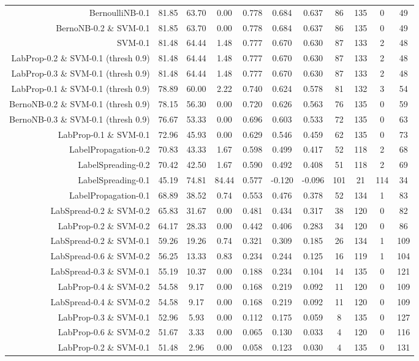 \begin{table}[!htb]
\begin{tabular}{r|c|c|c|c|c|c|c|c|c|c}
BernoulliNB-0.1 & 81.85 & 63.70 & 0.00 & 0.778 & 0.684 & 0.637 & 86 & 135 & 0 & 49 \\ 
BernoNB-0.2 \& SVM-0.1 & 81.85 & 63.70 & 0.00 & 0.778 & 0.684 & 0.637 & 86 & 135 & 0 & 49 \\ 
SVM-0.1 & 81.48 & 64.44 & 1.48 & 0.777 & 0.670 & 0.630 & 87 & 133 & 2 & 48 \\ 
LabProp-0.2 \& SVM-0.1 (thresh 0.9) & 81.48 & 64.44 & 1.48 & 0.777 & 0.670 & 0.630 & 87 & 133 & 2 & 48 \\ 
LabProp-0.3 \& SVM-0.1 (thresh 0.9) & 81.48 & 64.44 & 1.48 & 0.777 & 0.670 & 0.630 & 87 & 133 & 2 & 48 \\ 
LabProp-0.1 \& SVM-0.1 (thresh 0.9) & 78.89 & 60.00 & 2.22 & 0.740 & 0.624 & 0.578 & 81 & 132 & 3 & 54 \\ 
BernoNB-0.2 \& SVM-0.1 (thresh 0.9) & 78.15 & 56.30 & 0.00 & 0.720 & 0.626 & 0.563 & 76 & 135 & 0 & 59 \\ 
BernoNB-0.3 \& SVM-0.1 (thresh 0.9) & 76.67 & 53.33 & 0.00 & 0.696 & 0.603 & 0.533 & 72 & 135 & 0 & 63 \\ 
LabProp-0.1 \& SVM-0.1 & 72.96 & 45.93 & 0.00 & 0.629 & 0.546 & 0.459 & 62 & 135 & 0 & 73 \\ 
LabelPropagation-0.2 & 70.83 & 43.33 & 1.67 & 0.598 & 0.499 & 0.417 & 52 & 118 & 2 & 68 \\ 
LabelSpreading-0.2 & 70.42 & 42.50 & 1.67 & 0.590 & 0.492 & 0.408 & 51 & 118 & 2 & 69 \\ 
LabelSpreading-0.1 & 45.19 & 74.81 & 84.44 & 0.577 & -0.120 & -0.096 & 101 & 21 & 114 & 34 \\ 
LabelPropagation-0.1 & 68.89 & 38.52 & 0.74 & 0.553 & 0.476 & 0.378 & 52 & 134 & 1 & 83 \\ 
LabSpread-0.2 \& SVM-0.2 & 65.83 & 31.67 & 0.00 & 0.481 & 0.434 & 0.317 & 38 & 120 & 0 & 82 \\ 
LabProp-0.2 \& SVM-0.2 & 64.17 & 28.33 & 0.00 & 0.442 & 0.406 & 0.283 & 34 & 120 & 0 & 86 \\ 
LabSpread-0.2 \& SVM-0.1 & 59.26 & 19.26 & 0.74 & 0.321 & 0.309 & 0.185 & 26 & 134 & 1 & 109 \\ 
LabSpread-0.6 \& SVM-0.2 & 56.25 & 13.33 & 0.83 & 0.234 & 0.244 & 0.125 & 16 & 119 & 1 & 104 \\ 
LabSpread-0.3 \& SVM-0.1 & 55.19 & 10.37 & 0.00 & 0.188 & 0.234 & 0.104 & 14 & 135 & 0 & 121 \\ 
LabProp-0.4 \& SVM-0.2 & 54.58 & 9.17 & 0.00 & 0.168 & 0.219 & 0.092 & 11 & 120 & 0 & 109 \\ 
LabSpread-0.4 \& SVM-0.2 & 54.58 & 9.17 & 0.00 & 0.168 & 0.219 & 0.092 & 11 & 120 & 0 & 109 \\ 
LabProp-0.3 \& SVM-0.1 & 52.96 & 5.93 & 0.00 & 0.112 & 0.175 & 0.059 & 8 & 135 & 0 & 127 \\ 
LabProp-0.6 \& SVM-0.2 & 51.67 & 3.33 & 0.00 & 0.065 & 0.130 & 0.033 & 4 & 120 & 0 & 116 \\ 
LabProp-0.2 \& SVM-0.1 & 51.48 & 2.96 & 0.00 & 0.058 & 0.123 & 0.030 & 4 & 135 & 0 & 131 \\ 
\hline\hline
\end{tabular}
\end{table}
